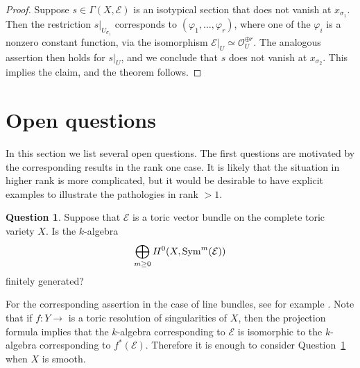 \documentclass[12pt]{amsart}
\theoremstyle{definition}
\newtheorem{question}[lemma]{Question}
\theoremstyle{remark}
\begin{document}
\begin{proof}
Suppose $s\in\Gamma(X, {\mathcal{E}})$ is an isotypical section that does not
vanish at $x_{\sigma_1}$.  Then the restriction  $s\vert_{U_{\sigma_1}}$
corresponds to $({\varphi}_1,\ldots,{\varphi}_r)$, where one of the ${\varphi}_i$ is a nonzero constant function, via the isomorphism ${\mathcal{E}}\vert_U\simeq
{\mathcal{O}}_U^{\oplus r}$. The analogous assertion then holds for
$s\vert_U$, and we conclude that $s$ does not vanish at
$x_{\sigma_2}$. This implies the claim, and the theorem follows.
\end{proof}

\section{Open questions}

In this section we list several open questions. The first questions
are motivated by the corresponding results in the rank one case. It
is likely that the situation in higher rank is more complicated, but
it would be desirable to have explicit examples to illustrate the
pathologies in rank $>1$.

\begin{question}\label{q3}
Suppose that ${\mathcal{E}}$ is a toric vector bundle on the complete toric
variety $X$. Is the $k$-algebra
\begin{equation}\label{algebra_of_E}
\bigoplus_{m\geq 0}H^0(X, {\rm Sym}^m({\mathcal{E}}))
\end{equation}
finitely generated?
\end{question}

For the corresponding assertion in the case of line bundles, see for
example \cite{Eli}. Note that if $f\colon Y{\xrightarrow{\ \ }}$ is a toric resolution of singularities 
of $X$, then the projection formula implies that the $k$-algebra corresponding to ${\mathcal{E}}$
is isomorphic to the $k$-algebra corresponding to $f^*({\mathcal{E}})$. Therefore it is enough to 
consider Question~\ref{q3} when $X$ is smooth.
\end{document}
